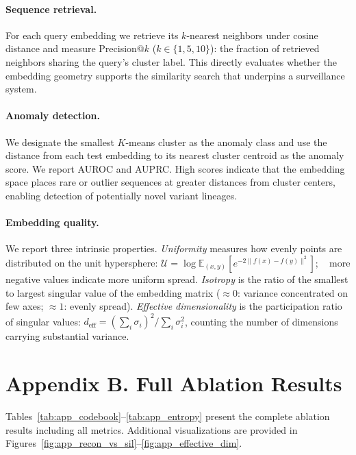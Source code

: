 \documentclass[pmlr]{jmlr}%
\begin{document}
\paragraph{Sequence retrieval.}
For each query embedding we retrieve its $k$-nearest neighbors under cosine distance and measure Precision@$k$ ($k \in \{1, 5, 10\}$): the fraction of retrieved neighbors sharing the query's cluster label. This directly evaluates whether the embedding geometry supports the similarity search that underpins a surveillance system.

\paragraph{Anomaly detection.}
We designate the smallest $K$-means cluster as the anomaly class and use the distance from each test embedding to its nearest cluster centroid as the anomaly score. We report AUROC and AUPRC. High scores indicate that the embedding space places rare or outlier sequences at greater distances from cluster centers, enabling detection of potentially novel variant lineages.

\paragraph{Embedding quality.}
We report three intrinsic properties. \emph{Uniformity} measures how evenly points are distributed on the unit hypersphere: $\mathcal{U} = \log \mathbb{E}_{(x,y)} [e^{-2\|f(x) - f(y)\|^2}]$; ~\citep{wang2020understanding} more negative values indicate more uniform spread. \emph{Isotropy} is the ratio of the smallest to largest singular value of the embedding matrix ($\approx 0$: variance concentrated on few axes; $\approx 1$: evenly spread). \emph{Effective dimensionality} is the participation ratio of singular values: $d_\text{eff} = (\sum_i \sigma_i)^2 / \sum_i \sigma_i^2$, counting the number of dimensions carrying substantial variance.

\section*{Appendix B. Full Ablation Results}
\label{app:ablations}

Tables~\ref{tab:app_codebook}--\ref{tab:app_entropy} present the complete ablation results including all metrics. Additional visualizations are provided in Figures~\ref{fig:app_recon_vs_sil}--\ref{fig:app_effective_dim}.
\end{document}
